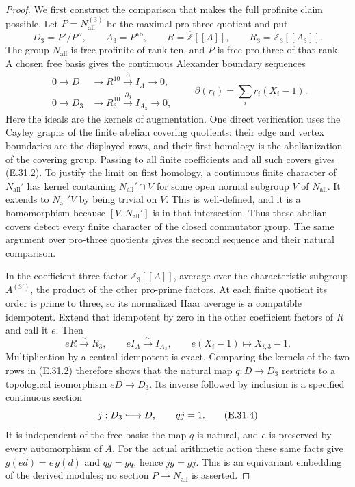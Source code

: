 \begin{proof}
We first construct the comparison that makes the full profinite
claim possible. Let $P=N_{\mathrm{all}}^{(3)}$ be the maximal
pro-three quotient and put
\[
 D_3=P'/P'',\qquad A_3=P^{\mathrm{ab}},\qquad
 R=\widehat{\mathbb Z}[[A]],\qquad R_3=\mathbb Z_3[[A_3]].
\]
The group $N_{\mathrm{all}}$ is free profinite of rank ten,
and $P$ is free pro-three of that rank. A chosen free basis
gives the continuous Alexander boundary sequences
\[
 \begin{aligned}
 0\longrightarrow D&\longrightarrow R^{10}
       \xrightarrow{\partial} I_A\longrightarrow0,\\
 0\longrightarrow D_3&\longrightarrow R_3^{10}
       \xrightarrow{\partial_3} I_{A_3}\longrightarrow0,
 \end{aligned}
 \qquad
 \partial(r_i)=\sum_i r_i(X_i-1).
 \tag{E.31.2}
\]
Here the ideals are the kernels of augmentation. One direct
verification uses the Cayley graphs of the finite abelian
covering quotients: their edge and vertex boundaries are the
displayed rows, and their first homology is the abelianization
of the covering group. Passing to all finite coefficients and
all such covers gives (E.31.2). To justify the limit on first
homology, a continuous finite character of $N_{\mathrm{all}}'$
has kernel containing $N_{\mathrm{all}}'\cap V$ for some open
normal subgroup $V$ of $N_{\mathrm{all}}$. It extends to
$N_{\mathrm{all}}'V$ by being trivial on $V$. This is
well-defined, and it is a homomorphism because
$[V,N_{\mathrm{all}}']$ is in that intersection. Thus these
abelian covers detect every finite character of the closed
commutator group. The same argument over pro-three quotients
gives the second sequence and their natural comparison.

In the coefficient-three factor $\mathbb Z_3[[A]]$, average
over the characteristic subgroup $A^{(3')}$, the product of
the other pro-prime factors. At each finite quotient its
order is prime to three, so its normalized Haar average
is a compatible idempotent. Extend that idempotent by zero
in the other coefficient factors of $R$ and call it $e$.
Then
\[
 eR\xrightarrow{\sim}R_3,
 \qquad eI_A\xrightarrow{\sim}I_{A_3},
 \qquad e(X_i-1)\longmapsto X_{i,3}-1.
 \tag{E.31.3}
\]
Multiplication by a central idempotent is exact.
Comparing the kernels of the two rows in (E.31.2)
therefore shows that the natural map $q:D\to D_3$
restricts to a topological isomorphism $eD\to D_3$.
Its inverse followed by inclusion is a specified continuous
section
\[
 j:D_3\lhook\joinrel\longrightarrow D,
                  \qquad qj=1.
 \tag{E.31.4}
\]
It is independent of the free basis: the map $q$ is natural,
and $e$ is preserved by every automorphism of $A$.
For the actual arithmetic action these same facts give
$g(e d)=e\,g(d)$ and $qg=gq$, hence $jg=gj$.
This is an equivariant embedding of the derived modules;
no section $P\to N_{\mathrm{all}}$ is asserted.


\end{proof}
